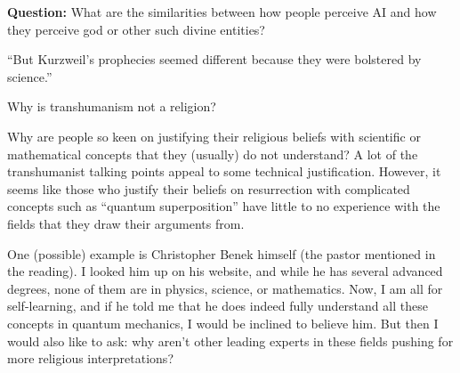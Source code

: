 \textbf{Question:} What are the similarities between how people perceive AI and how they perceive god or other such divine entities?


``But Kurzweil’s prophecies seemed different because they were bolstered by science.''

Why is transhumanism not a religion?

Why are people so keen on justifying their religious beliefs with scientific or  mathematical concepts that they (usually) do not understand?
A lot of the transhumanist talking points appeal to some technical justification.
However, it seems like those who justify their beliefs on resurrection with complicated concepts such as ``quantum superposition'' have little to no experience with the fields that they draw their arguments from.

One (possible) example is Christopher Benek himself (the pastor mentioned in the reading).
I looked him up on his website, and while he has several advanced degrees, none of them are in physics, science, or mathematics.
Now, I am all for self-learning, and if he told me that he does indeed fully understand all these concepts in quantum mechanics, I would be inclined to believe him.
But then I would also like to ask: why aren't other leading experts in these fields pushing for more religious interpretations?